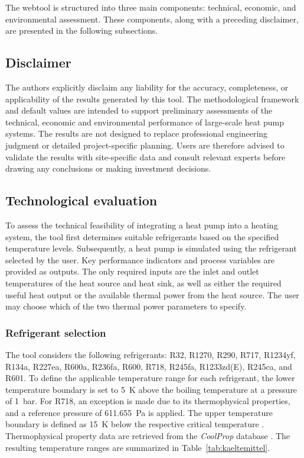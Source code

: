 \documentclass[letterpaper,11pt]{article}
\begin{document}
	The webtool is structured into three main components: technical, economic, and environmental assessment. These components, along with a preceding disclaimer, are presented in the following subsections.

	\subsection{Disclaimer}
	
	The authors explicitly disclaim any liability for the accuracy, completeness, or applicability of the results generated by this tool. The methodological framework and default values are intended to support preliminary assessments of the technical, economic and environmental performance of large-scale heat pump systems. The results are not designed to replace professional engineering judgment or detailed project-specific planning. Users are therefore advised to validate the results with site-specific data and consult relevant experts before drawing any conclusions or making investment decisions.
	
	\subsection{Technological evaluation}
	
	To assess the technical feasibility of integrating a heat pump into a heating system, the tool first determines suitable refrigerants based on the specified temperature levels. Subsequently, a heat pump is simulated using the refrigerant selected by the user. Key performance indicators and process variables are provided as outputs. The only required inputs are the inlet and outlet temperatures of the heat source and heat sink, as well as either the required useful heat output or the available thermal power from the heat source. The user may choose which of the two thermal power parameters to specify.

		\subsubsection{Refrigerant selection}
		
		The tool considers the following refrigerants: R32, R1270, R290, R717, R1234yf, R134a, R227ea, R600a, R236fa, R600, R718, R245fa, R1233zd(E), R245ca, and R601. To define the applicable temperature range for each refrigerant, the lower temperature boundary is set to 5~K above the boiling temperature at a pressure of 1~bar. For R718, an exception is made due to its thermophysical properties, and a reference pressure of 611.655~Pa is applied. The upper temperature boundary is defined as 15~K below the respective critical temperature \cite{vdi4646}. Thermophysical property data are retrieved from the \textit{CoolProp} database \cite{coolprop}. The resulting temperature ranges are summarized in Table~\ref{tab:kaeltemittel}.
		
\end{document}

